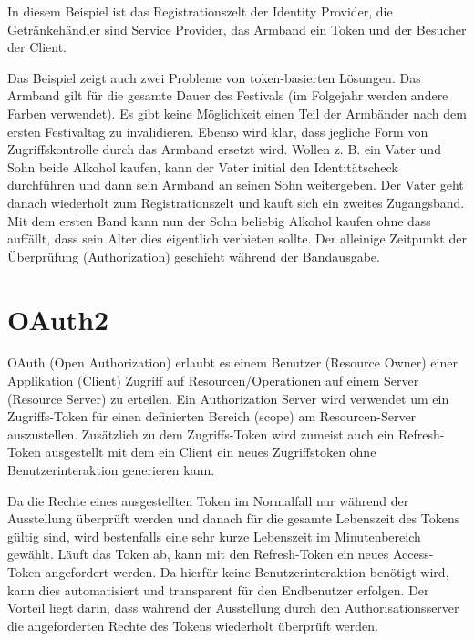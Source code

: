 In diesem Beispiel ist das Registrationszelt der Identity Provider, die Getränkehändler sind Service Provider, das Armband ein Token und der Besucher der Client.

Das Beispiel zeigt auch zwei Probleme von token-basierten Lösungen. Das Armband gilt für die gesamte Dauer des Festivals (im Folgejahr werden andere Farben verwendet). Es gibt keine Möglichkeit einen Teil der Armbänder nach dem ersten Festivaltag zu invalidieren. Ebenso wird klar, dass jegliche Form von Zugriffskontrolle durch das Armband ersetzt wird. Wollen z. B. ein Vater und Sohn beide Alkohol kaufen, kann der Vater initial den Identitätscheck durchführen und dann sein Armband an seinen Sohn weitergeben. Der Vater geht danach wiederholt zum Registrationszelt und kauft sich ein zweites Zugangsband. Mit dem ersten Band kann nun der Sohn beliebig Alkohol kaufen ohne dass auffällt, dass sein Alter dies eigentlich verbieten sollte. Der alleinige Zeitpunkt der Überprüfung (Authorization) geschieht während der Bandausgabe.

\section{OAuth2}

OAuth (Open Authorization) erlaubt es einem Benutzer (Resource Owner) einer Applikation (Client) Zugriff auf Resourcen/Operationen auf einem Server (Resource Server) zu erteilen. Ein Authorization Server wird verwendet um ein Zugriffs-Token für einen definierten Bereich (scope) am Resourcen-Server auszustellen. Zusätzlich zu dem Zugriffs-Token wird zumeist auch ein Refresh-Token ausgestellt mit dem ein Client ein neues Zugriffstoken ohne Benutzerinteraktion generieren kann.

Da die Rechte eines ausgestellten Token im Normalfall nur während der Ausstellung überprüft werden und danach für die gesamte Lebenszeit des Tokens gültig sind, wird bestenfalls eine sehr kurze Lebenszeit im Minutenbereich gewählt. Läuft das Token ab, kann mit den Refresh-Token ein neues Access-Token angefordert werden. Da hierfür keine Benutzerinteraktion benötigt wird, kann dies automatisiert und transparent für den Endbenutzer erfolgen. Der Vorteil liegt darin, dass während der Ausstellung durch den Authorisationsserver die angeforderten Rechte des Tokens wiederholt überprüft werden.

